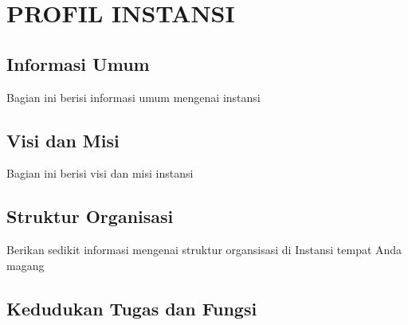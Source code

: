 \chapter{PROFIL INSTANSI}

\section{Informasi Umum}
Bagian ini berisi informasi umum mengenai instansi

\section{Visi dan Misi}
Bagian ini berisi visi dan misi instansi

\section{Struktur Organisasi}
Berikan sedikit informasi mengenai struktur organsisasi di Instansi tempat Anda magang

\section{Kedudukan Tugas dan Fungsi}
